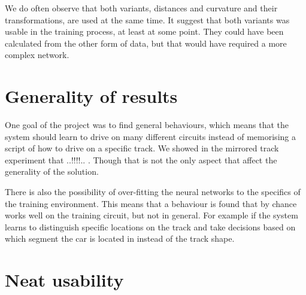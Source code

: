 We do often observe that both variants, distances and curvature and their transformations, are used at the same time. It suggest that both variants was usable in the training process, at least at some point. They could have been calculated from the other form of data, but that would have required a more complex network.




\section{Generality of results}

One goal of the project was to find general behaviours, which means that the system should learn to drive on many different circuits instead of memorising a script of how to drive on a specific track. We showed in the mirrored track experiment that ..!!!!.. . Though that is not the only aspect that affect the generality of the solution. 

There is also the possibility of over-fitting the neural networks to the specifics of the training environment. This means that a behaviour is found that by chance works well on the training circuit, but not in general. For example if the system learns to distinguish specific locations on the track and take decisions based on which segment the car is located in instead of the track shape.




\section{Neat usability}

